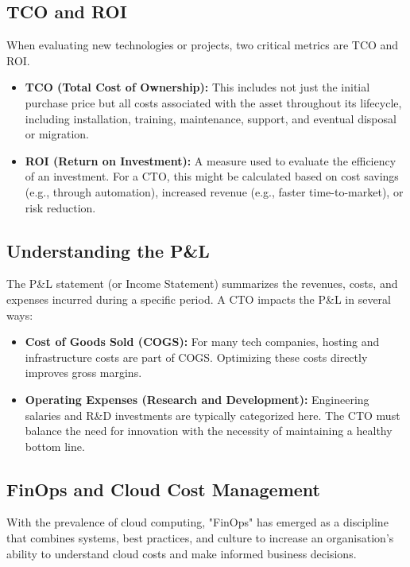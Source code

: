 \subsection{\gls{TCO} and \gls{ROI}}

When evaluating new technologies or projects, two critical metrics are \gls{TCO} and \gls{ROI}.

\begin{itemize}
    \item \textbf{\gls{TCO} (Total Cost of Ownership):} This includes not just the initial purchase price but all costs associated with the asset throughout its lifecycle, including installation, training, maintenance, support, and eventual disposal or migration.
    \item \textbf{\gls{ROI} (Return on Investment):} A measure used to evaluate the efficiency of an investment. For a \gls{CTO}, this might be calculated based on cost savings (e.g., through automation), increased revenue (e.g., faster time-to-market), or risk reduction.
\end{itemize}

\subsection{Understanding the \gls{P&L}}

The \gls{P&L} statement (or Income Statement) summarizes the revenues, costs, and expenses incurred during a specific period. A \gls{CTO} impacts the \gls{P&L} in several ways:

\begin{itemize}
    \item \textbf{Cost of Goods Sold (COGS):} For many tech companies, hosting and infrastructure costs are part of COGS. Optimizing these costs directly improves gross margins.
    \item \textbf{Operating Expenses (Research and Development):} Engineering salaries and R\&D investments are typically categorized here. The \gls{CTO} must balance the need for innovation with the necessity of maintaining a healthy bottom line.
\end{itemize}

\subsection{\gls{FinOps} and Cloud Cost Management}

With the prevalence of cloud computing, "\gls{FinOps}" has emerged as a discipline that combines systems, best practices, and culture to increase an organisation's ability to understand cloud costs and make informed business decisions.

